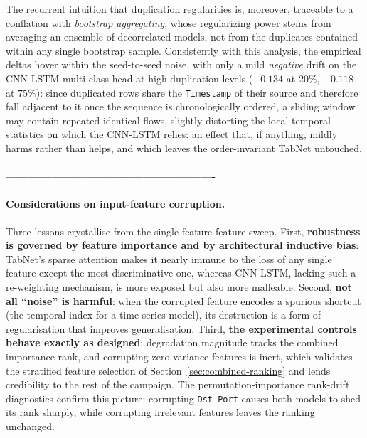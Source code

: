 \documentclass[../main.tex]{subfiles}
\begin{document}
The recurrent intuition that duplication regularities is, moreover, traceable to a conflation with \emph{bootstrap aggregating}, whose regularizing power stems from averaging an ensemble of decorrelated models, not from the duplicates contained within any single bootstrap sample. Consistently with this analysis, the empirical deltas hover within the seed-to-seed noise, with only a mild \emph{negative} drift on the CNN-LSTM multi-class head at high duplication levels ($-0.134$ at $20\%$, $-0.118$ at $75\%$): since duplicated rows share the \texttt{Timestamp} of their source and therefore fall adjacent to it once the sequence is chronologically ordered, a sliding window may contain repeated identical flows, slightly distorting the local temporal statistics on which the CNN-LSTM relies: an effect that, if anything, mildly harms rather than helps, and which leaves the order-invariant TabNet untouched.



\paragraph{-------------------------------------------------------}
\paragraph{Considerations on input-feature corruption.}
Three lessons crystallise from the single-feature feature sweep. First, \textbf{robustness is governed by feature importance and by architectural inductive bias}: TabNet's sparse attention makes it nearly immune to the loss of any single feature except the most discriminative one, whereas CNN-LSTM, lacking such a re-weighting mechanism, is more exposed but also more malleable. Second, \textbf{not all ``noise'' is harmful}: when the corrupted feature encodes a spurious shortcut (the temporal index for a time-series model), its destruction is a form of regularisation that improves generalisation. Third, \textbf{the experimental controls behave exactly as designed}: degradation magnitude tracks the combined importance rank, and corrupting zero-variance features is inert, which validates the stratified feature selection of Section~\ref{sec:combined-ranking} and lends credibility to the rest of the campaign. The permutation-importance rank-drift diagnostics confirm this picture: corrupting \texttt{Dst Port} causes both models to shed its rank sharply, while corrupting irrelevant features leaves the ranking unchanged.
\end{document}
